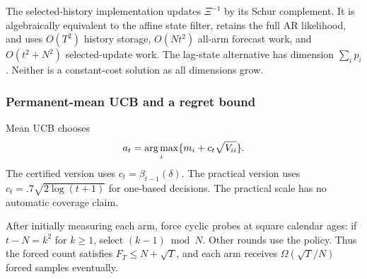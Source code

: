 The selected-history implementation updates $\Xi^{-1}$ by its Schur complement. It is algebraically equivalent to the affine state filter, retains the full AR likelihood, and uses $O(T^2)$ history storage, $O(Nt^2)$ all-arm forecast work, and $O(t^2+N^2)$ selected-update work. The lag-state alternative has dimension $\sum_i p_i$. Neither is a constant-cost solution as all dimensions grow.

\subsubsection{Permanent-mean UCB and a regret bound}
Mean UCB chooses
\begin{equation}
a_t=\operatorname*{arg\,max}_i\{m_i+c_t\sqrt{V_{ii}}\}.
\label{spatiotemporal_bandits:eq:mean-ucb}
\end{equation}
The certified version uses $c_t=\beta_{t-1}(\delta)$. The practical version uses $c_t=.7\sqrt{2\log(t+1)}$ for one-based decisions. The practical scale has no automatic coverage claim.

After initially measuring each arm, force cyclic probes at square calendar ages: if $t-N=k^2$ for $k\ge1$, select $(k-1)\bmod N$. Other rounds use the policy. Thus the forced count satisfies $F_T\le N+\sqrt T$, and each arm receives $\Omega(\sqrt T/N)$ forced samples eventually.

